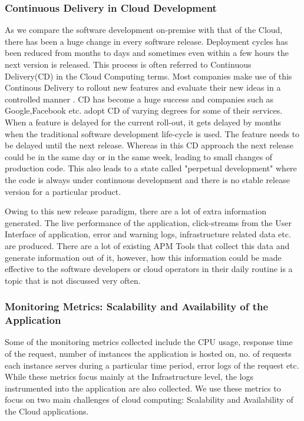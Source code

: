 \documentclass[article,type=msc,colorback,12pt,accentcolor=tud7b,table]{tudthesis}
\begin{document}
 	\subsubsection{Continuous Delivery in Cloud Development}
 	As we compare the software development on-premise with that of the Cloud, there has been a huge change in every software release. Deployment cycles has been reduced from months to days and sometimes even within a few hours the next version is released. This process is often referred to Continuous Delivery(CD) in the Cloud Computing terms. Most companies make use of this Continous Delivery to rollout new features and evaluate their new ideas in a controlled manner \cite{kohavi2007practical}. CD has become a huge success and companies such as Google,Facebook etc. adopt CD of varying degrees for some of their services. When a feature is delayed for the current roll-out, it gets delayed by months when the traditional software development life-cycle is used. The feature needs to be delayed until the next release. Whereas in this CD approach the next release could be in the same day or in the same week, leading to small changes of production code. This also leads to a state called "perpetual development" where the code is always under continuous development and there is no stable release version for a particular product.  	\par Owing to this new release paradigm, there are a lot of extra information generated. The live performance of the application, click-streams from the User Interface of application, error and warning logs, infrastructure related data etc. are produced. There are a lot of existing APM Tools that collect this data and generate information out of it, however, how this information could be made effective to the software developers or cloud operators in their daily routine is a topic that is not discussed very often. 
 	
 	\subsubsection{Monitoring Metrics: Scalability and Availability of the Application}
 	
	Some of the monitoring metrics collected include the CPU usage, response time of the request, number of instances the application is hosted on, no. of requests each instance serves during a particular time period, error logs of the request etc. While these metrics focus mainly at the Infrastructure level, the logs instrumented into the application are also collected. We use these metrics to focus on two main challenges of cloud computing: Scalability and Availability of the Cloud applications.
	
\end{document}
